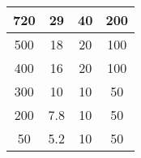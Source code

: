 \documentclass{article}
\begin{document}
\begin{table}[H]
\begin{tabular}{|c|c|c|c|}
    720           & 29       & 40               & 200                  \\ \hline
    500           & 18       & 20               & 100                  \\ \hline
    400           & 16       & 20               & 100                  \\ \hline
    300           & 10       & 10               & 50                   \\ \hline
    200           & 7.8      & 10               & 50                   \\ \hline
    50            & 5.2      & 10               & 50                   \\ \hline
    \end{tabular}
    \end{table}
\end{document}

